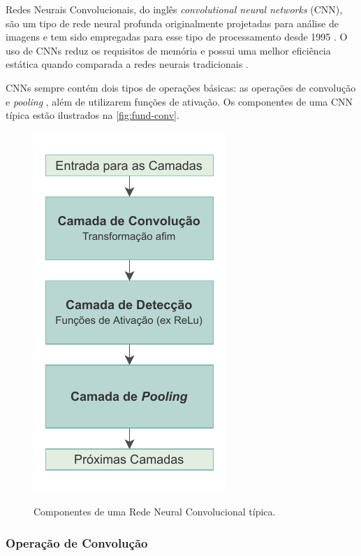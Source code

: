 Redes Neurais Convolucionais, do inglês \textit{convolutional neural networks} (CNN), são um tipo de rede neural profunda originalmente projetadas para análise de imagens \cite{ref:Eden-Ierapetritou-Towler} e tem sido empregadas para esse tipo de processamento desde 1995 \cite{ref:Yan}. O uso de CNNs reduz os requisitos de memória e possui uma melhor eficiência estática quando comparada a redes neurais tradicionais \cite{ref:Goodfellow-Bengio-Courville}.

CNNs sempre contém dois tipos de operações básicas: as operações de convolução e \textit{pooling} \cite{ref:Eden-Ierapetritou-Towler}, além de utilizarem funções de ativação. Os componentes de uma CNN típica estão ilustrados na \autoref{fig:fund-conv}.

\begin{figure}[h!] %
  \centering
  \caption{Componentes de uma Rede Neural Convolucional típica.}
  \includegraphics[scale=1.1]{img/img-fundamentacao-conv.pdf}
  \label{fig:fund-conv}
\end{figure}

\subsubsection{Operação de Convolução} \label{cap:fund-ia-rn-conv-conv}

